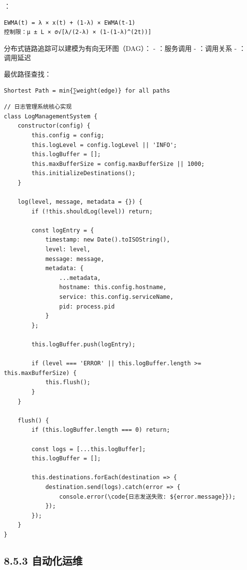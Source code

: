 ：

\begin{lstlisting}
EWMA(t) = λ × x(t) + (1-λ) × EWMA(t-1)
控制限：μ ± L × σ√[λ/(2-λ) × (1-(1-λ)^(2t))]
\end{lstlisting}


分布式链路追踪可以建模为有向无环图（DAG）： - ：服务调用 - ：调用关系 - ：调用延迟

最优路径查找：

\begin{lstlisting}
Shortest Path = min{∑weight(edge)} for all paths
\end{lstlisting}

\begin{lstlisting}[style=javascript]
// 日志管理系统核心实现
class LogManagementSystem {
    constructor(config) {
        this.config = config;
        this.logLevel = config.logLevel || 'INFO';
        this.logBuffer = [];
        this.maxBufferSize = config.maxBufferSize || 1000;
        this.initializeDestinations();
    }
    
    log(level, message, metadata = {}) {
        if (!this.shouldLog(level)) return;
        
        const logEntry = {
            timestamp: new Date().toISOString(),
            level: level,
            message: message,
            metadata: {
                ...metadata,
                hostname: this.config.hostname,
                service: this.config.serviceName,
                pid: process.pid
            }
        };
        
        this.logBuffer.push(logEntry);
        
        if (level === 'ERROR' || this.logBuffer.length >= this.maxBufferSize) {
            this.flush();
        }
    }
    
    flush() {
        if (this.logBuffer.length === 0) return;
        
        const logs = [...this.logBuffer];
        this.logBuffer = [];
        
        this.destinations.forEach(destination => {
            destination.send(logs).catch(error => {
                console.error(\code{日志发送失败: ${error.message}});
            });
        });
    }
}
\end{lstlisting}

\hypertarget{ux81eaux52a8ux5316ux8fd0ux7ef4}{%
\subsection{8.5.3 自动化运维}\label{ux81eaux52a8ux5316ux8fd0ux7ef4}}

